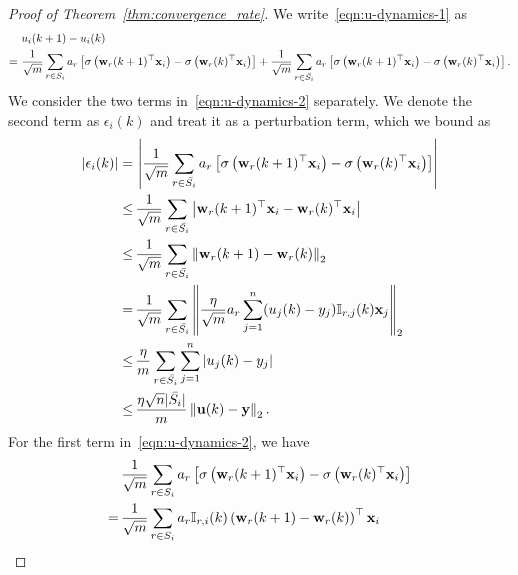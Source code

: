 \begin{proof}[Proof of Theorem~\ref{thm:convergence_rate}]
	We write~\eqref{eqn:u-dynamics-1} as
	\begin{equation} \label{eqn:u-dynamics-2}
	\begin{aligned}
	&u_i(k+1) - u_i(k) \\
	=\ & \frac{1}{\sqrt m} \sum_{r\in S_i} a_r \left[ \sigma\left( \mathbf{w}_r(k+1)^\top \mathbf{x}_i \right)  -  \sigma\left( \mathbf{w}_r(k)^\top \mathbf{x}_i \right) \right]
	+ \frac{1}{\sqrt m} \sum_{r\in \bar{S_i}} a_r \left[ \sigma\left( \mathbf{w}_r(k+1)^\top \mathbf{x}_i \right)  -  \sigma\left( \mathbf{w}_r(k)^\top \mathbf{x}_i \right) \right].
	\end{aligned}
	\end{equation}
	We consider the two terms in~\eqref{eqn:u-dynamics-2} separately.
	We denote the second term as $\epsilon_i(k)$ and treat it as a perturbation term, which we bound as
	\begin{equation} \label{eqn:u-dynamics-second-term}
	\begin{aligned}
	\left|\epsilon_i(k)\right| = \, &\left| \frac{1}{\sqrt m} \sum_{r\in \bar{S_i}} a_r \left[ \sigma\left( \mathbf{w}_r(k+1)^\top \mathbf{x}_i \right)  -  \sigma\left( \mathbf{w}_r(k)^\top \mathbf{x}_i \right) \right] \right| \\
	\le\,& \frac{1}{\sqrt m} \sum_{r\in \bar{S_i}} \left| \mathbf{w}_r(k+1)^\top \mathbf{x}_i  - \mathbf{w}_r(k)^\top \mathbf{x}_i  \right| \\
	\le\,& \frac{1}{\sqrt m} \sum_{r\in \bar{S_i}} \left\|\mathbf{w}_r(k+1) - \mathbf{w}_r(k) \right\|_2  \\
	=\,& \frac{1}{\sqrt m} \sum_{r\in \bar{S_i}} \left\|\frac{\eta}{\sqrt m} a_r \sum_{j=1}^n (u_j(k) - y_j) \mathbb{I}_{r, j}(k) \mathbf{x}_j \right\|_2  \\
	\le\,& \frac{\eta}{m} \sum_{r\in \bar{S_i}} \sum_{j=1}^n |u_j(k) - y_j|   \\
	\le\,& \frac{\eta \sqrt n |\bar{S_i}|}{m} \left\|\mathbf{u}(k) - \mathbf{y}\right\|_2.
	\end{aligned}
	\end{equation}
	For the first term in~\eqref{eqn:u-dynamics-2}, we have
	\begin{equation} \label{eqn:u-dynamics-first-term}
	\begin{aligned}
	&\frac{1}{\sqrt m} \sum_{r\in S_i} a_r \left[ \sigma\left( \vect w_r(k+1)^\top \vect x_i \right)  -  \sigma\left( \vect w_r(k)^\top \vect x_i \right) \right] \\
	=\,& \frac{1}{\sqrt m} \sum_{r\in S_i} a_r \indict_{r, i}(k) \left(  \vect w_r(k+1)  -  \vect w_r(k)\right)^\top \vect x_i   \\

\end{aligned}
\end{equation}
\end{proof}
